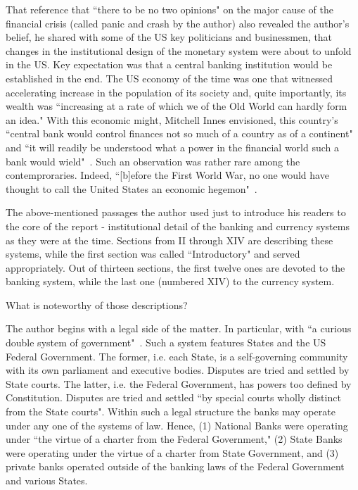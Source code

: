 That reference that ``there to be no two opinions" on the major cause of the financial crisis (called panic and crash by the author) also revealed the author's belief, he shared with some of the US key politicians and businessmen, that changes in the institutional design of the monetary system were about to unfold in the US. Key expectation was that a central banking institution would be established in the end. The US economy of the time was one that witnessed accelerating increase in the population of its society and, quite importantly, its wealth was ``increasing at a rate of which we of the Old World can hardly form an idea." With this economic might, Mitchell Innes envisioned, this country's ``central bank would control finances not so much of a country as of a continent" and ``it will readily be understood what a power in the financial world such a bank would wield"~\citep[pp.~1-2]{innes1910}. Such an observation was rather rare among the contemproraries. Indeed, ``[b]efore the First World War, no one would have thought to call the United States an economic hegemon"~\cite[p.~5]{roberts2012}.

The above-mentioned passages the author used just to introduce his readers to the core of the report - institutional detail of the banking and currency systems as they were at the time. Sections from II through XIV are describing these systems, while the first section was called ``Introductory" and served appropriately. Out of thirteen sections, the first twelve ones are devoted to the banking system, while the last one (numbered XIV) to the currency system.

What is noteworthy of those descriptions? 

The author begins with a legal side of the matter. In particular, with ``a curious double system of government"~\citep[p.~3]{innes1910}. Such a system features States and the US Federal Government. The former, i.e. each State, is a self-governing community with its own parliament and executive bodies. Disputes are tried and settled by State courts. The latter, i.e. the Federal Government, has powers too defined by Constitution. Disputes are tried and settled ``by special courts wholly distinct from the State courts". Within such a legal structure the banks may operate under any one of the systems of law. Hence, (1) National Banks were operating under ``the virtue of a charter from the Federal Government," (2) State Banks were operating under the virtue of a charter from State Government, and (3) private banks operated outside of the banking laws of the Federal Government and various States. 

